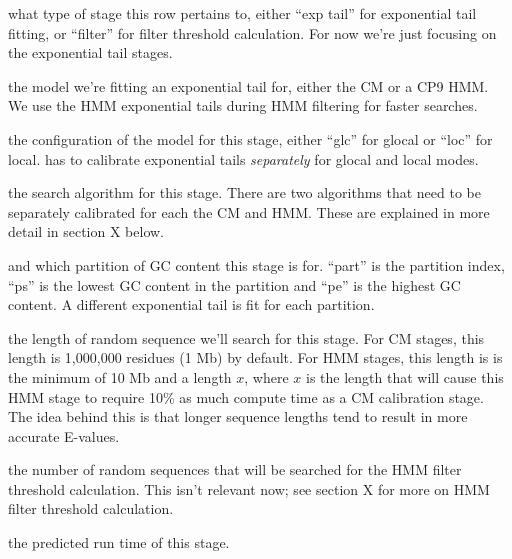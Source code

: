 \begin{wideitem}
\item[\emprog{stage}] what type of stage this row pertains to, either
  ``exp tail'' for exponential tail fitting, or ``filter'' for filter
  threshold calculation. For now we're just focusing on the exponential tail
  stages. 

\item[\emprog{mod}] the model we're fitting an exponential tail for,
  either the CM or a CP9 HMM. We use the HMM exponential tails during
  HMM filtering for faster searches.

\item[\emprog{cfg}] the configuration of the model for this stage,
  either ``glc'' for glocal or ``loc'' for local. 
  has to calibrate exponential tails \emph{separately} for glocal and
  local modes.

\item[\emprog{alg}] the search algorithm for this stage. There are two
  algorithms that need to be separately calibrated for each the CM and
  HMM. These are explained in more detail in section X below.

\item[\emprog{part, ps} and \emprog{pe}] which partition of GC
  content this stage is for. ``part'' is the partition index, ``ps''
  is the lowest GC content in the partition and ``pe'' is the highest
  GC content. A different exponential tail is fit for
  each partition. 

\item[\emprog{expL}] the length of random sequence we'll search for
  this stage. For CM stages, this length is 1,000,000 residues (1 Mb)
  by default. For HMM stages, this length is is the minimum
  of 10 Mb and a length $x$, where $x$ is the length that will cause
  this HMM stage to require 10\% as much compute time as a CM
  calibration stage. The idea behind this is that longer sequence
  lengths tend to result in more accurate E-values.

\item[\emprog{filN}] the number of random sequences that will be
  searched for the HMM filter threshold calculation. This isn't
  relevant now; see section X for more on HMM filter threshold
  calculation. 

\item[\emprog{predicted time}] the predicted run time of this stage. 

\end{wideitem}

